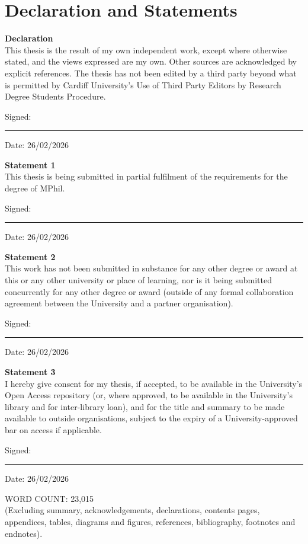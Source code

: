 \markboth{}{}
\chapter*{Declaration and Statements}
\label{chapter:Declaration and Statements}
\textbf{Declaration}\\
This thesis is the result of my own independent work, except where otherwise stated, and the views expressed are my own. Other sources are acknowledged by explicit references. The thesis has not been edited by a third party beyond what is permitted by Cardiff University's Use of Third Party Editors by Research Degree Students Procedure.

Signed: \rule{1.5in}{.55pt} \hfill Date: 26/02/2026


\textbf{Statement 1}\\
This thesis is being submitted in partial fulfilment of the requirements for the degree of MPhil.

Signed: \rule{1.5in}{.55pt} \hfill Date: 26/02/2026

\textbf{Statement 2}\\
This work has not been submitted in substance for any other degree or award at this or any other university or place of learning, nor is it being submitted concurrently for any other degree or award (outside of any formal collaboration agreement between the University and a partner organisation).

Signed: \rule{1.5in}{.55pt} \hfill Date: 26/02/2026

\textbf{Statement 3}\\
I hereby give consent for my thesis, if accepted, to be available in the University's Open Access repository (or, where approved, to be available in the University's library and for inter-library loan), and for the title and summary to be made available to outside organisations, subject to the expiry of a University-approved bar on access if applicable.

Signed: \rule{1.5in}{.55pt} \hfill Date: 26/02/2026

WORD COUNT: 23,015\\
(Excluding summary, acknowledgements, declarations, contents pages, appendices, tables, diagrams and figures, references, bibliography, footnotes and endnotes).
